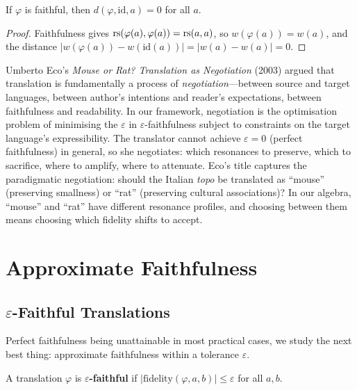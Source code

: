 \begin{theorem}
\label{thm:dist-faithful-id}
If $\varphi$ is faithful, then $d(\varphi, \mathrm{id}, a) = 0$ for all $a$.
\end{theorem}

\begin{proof}
Faithfulness gives $\mathrm{rs}(\varphi(a), \varphi(a)) = \mathrm{rs}(a, a)$, so $w(\varphi(a)) = w(a)$, and the distance $|w(\varphi(a)) - w(\mathrm{id}(a))| = |w(a) - w(a)| = 0$.
\end{proof}

\begin{remark}
Umberto Eco's \textit{Mouse or Rat? Translation as Negotiation} (2003) argued that translation is fundamentally a process of \emph{negotiation}---between source and target languages, between author's intentions and reader's expectations, between faithfulness and readability.  In our framework, negotiation is the optimisation problem of minimising the $\varepsilon$ in $\varepsilon$-faithfulness subject to constraints on the target language's expressibility.  The translator cannot achieve $\varepsilon = 0$ (perfect faithfulness) in general, so she negotiates: which resonances to preserve, which to sacrifice, where to amplify, where to attenuate.  Eco's title captures the paradigmatic negotiation: should the Italian \emph{topo} be translated as ``mouse'' (preserving smallness) or ``rat'' (preserving cultural associations)?  In our algebra, ``mouse'' and ``rat'' have different resonance profiles, and choosing between them means choosing which fidelity shifts to accept.
\end{remark}

\section{Approximate Faithfulness}
\label{sec:untranslatable:approximate}

\subsection{$\varepsilon$-Faithful Translations}

Perfect faithfulness being unattainable in most practical cases, we study
the next best thing: approximate faithfulness within a tolerance $\varepsilon$.

\begin{definition}
\label{def:eps-faithful}
A translation $\varphi$ is $\varepsilon$\textbf{-faithful} if
$|\mathrm{fidelity}(\varphi, a, b)| \leq \varepsilon$ for all $a, b$.
\end{definition}

